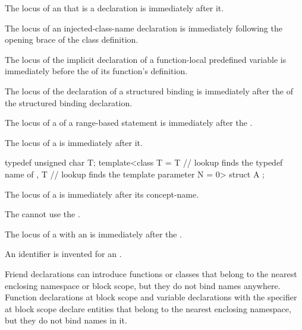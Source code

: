 \pnum
The locus of an 
that is a declaration is immediately after it.

\pnum
The locus of an injected-class-name declaration
is immediately following the opening brace of the class definition.

\pnum
The locus of the implicit declaration of
a function-local predefined variable
is immediately before
the  of its function's definition.

\pnum
The locus of the declaration of a structured binding
is immediately after
the  of the structured binding declaration.

\pnum
The locus of a 
of a range-based  statement
is immediately after the .

\pnum
The locus of a  is immediately after it.
\begin{example}
\begin{codeblock}
typedef unsigned char T;
template<class T
  = T               // lookup finds the typedef name of 
  , T               // lookup finds the template parameter
    N = 0> struct A { };
\end{codeblock}
\end{example}

\pnum
The locus of a 
is immediately after its concept-name.
\begin{note}
The  cannot use
the .
\end{note}

\pnum
The locus of a 
with an 
is immediately after the .
\begin{note}
An identifier is invented
for an .
\end{note}

\pnum
\begin{note}
Friend declarations can introduce functions or classes
that belong to the nearest enclosing namespace or block scope,
but they do not bind names anywhere.
Function declarations at block scope and
variable declarations with the  specifier at block scope
declare entities
that belong to the nearest enclosing namespace,
but they do not bind names in it.
\end{note}

